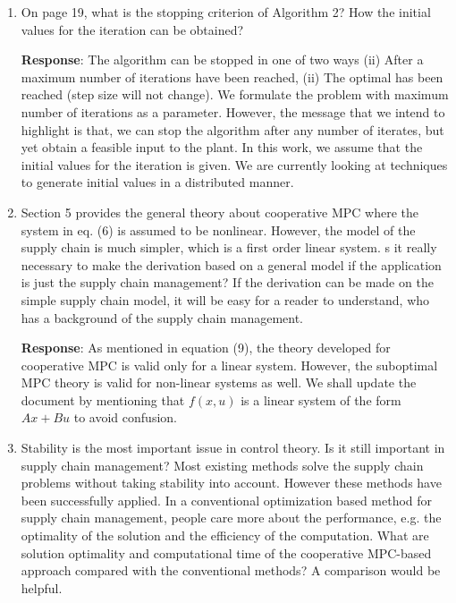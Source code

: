 \documentclass{article}
\newcommand{\response}[1]{\textbf{Response}: #1}
\begin{document}
\begin{enumerate}
\response{The two problems are coupled via the decision variables. To evaluate either $V_1$ or $V_2$, we need to know the other subsystems decision variables. We do not make any claims about the convergence of algorithm-1. Later in the text, we claim that if $V_1$ and $V_2$ are both set to the overall (centralized) optimization objective, then Algorithm-1 converges to the centralized solution. The parameter $\omega$ is a number between $(0,1)$ used to take convex combinations of the points obtained during the optimizations mentioned in Algorithm-1. We need to take convex combination, because the full-step might not be a descent direction.}

\item  On page 19, what is the stopping criterion of Algorithm 2? How the initial values for the iteration can be obtained?

\response{The algorithm can be stopped in one of two ways (ii) After a maximum number of iterations have been reached, (ii) The optimal has been reached (step size will not change). We formulate the problem with maximum number of iterations as a parameter. However, the message that we intend to highlight is that, we can stop the algorithm after any number of iterates, but yet obtain a feasible input to the plant.  In this work, we assume that the initial values for the iteration is given. We are currently looking at techniques to generate initial values in a distributed manner.}

\item  Section 5 provides the general theory about cooperative MPC where the system in eq. (6) is assumed to be nonlinear. However, the model of the supply chain is much simpler, which is a first order linear system. s it really necessary to make the derivation based on a general model if the application is just the supply chain management? If the derivation can be made on the simple supply chain model, it will be easy for a reader to understand, who has a background of the supply chain management.

\response{As mentioned in equation (9), the theory developed  for cooperative MPC is valid only  for a linear system. However, the suboptimal MPC theory is valid for non-linear systems as well.  We shall update the document by mentioning that $f(x,u)$ is a linear system of the form $Ax+Bu$ to avoid confusion.}

\item  Stability is the most important issue in control theory. Is it still important in supply chain management? Most existing methods solve the supply chain problems without taking stability into account. However these methods have been successfully applied. In a conventional optimization based method for supply chain management, people care more about the performance, e.g. the optimality of the solution and the efficiency of the computation. What are solution optimality and computational time of the cooperative MPC-based approach compared with the conventional methods? A comparison would be helpful.


\end{enumerate}
\end{document}
